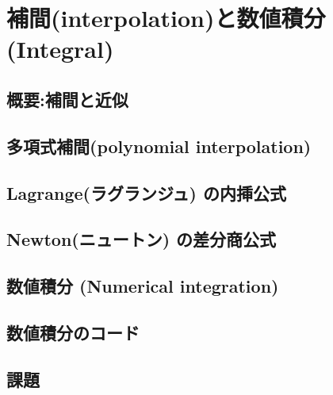 \documentclass[10pt,a4j]{jreport}
\begin{document}
\chapter{補間(interpolation)と数値積分(Integral)}
\section{概要:補間と近似}

\section{多項式補間(polynomial interpolation)}

\section{Lagrange(ラグランジュ) の内挿公式}

\section{Newton(ニュートン) の差分商公式}

\section{数値積分 (Numerical integration)}

\section{数値積分のコード}

\section{課題}

\end{document}
